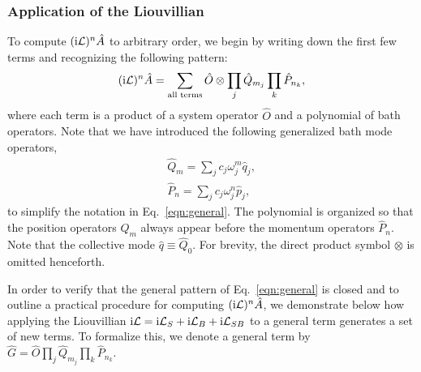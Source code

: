 \documentclass[preprint,aip,jcp]{revtex4-2}
\newcommand{\im}{\textup{i}}
\newcommand{\Lv}{\mathcal{L}}
\begin{document}
\subsubsection{Application of the Liouvillian \label{subsec:liouvillian}}
To compute $(\im\Lv)^n \hat{A}$ to arbitrary order,  we begin by writing down the first few terms and recognizing the following pattern: 
\begin{equation}\label{eqn:general}
    (\im \Lv)^n \hat{A} = \sum_{\text{all terms}} \hat{O} \otimes \prod_{j} \hat{Q}_{m_{j}} \prod_{k} \hat{P}_{n_k},
\end{equation}
where each term is a product of a system operator $\hat{O}$ and a polynomial of bath operators. Note that we have introduced the following generalized bath mode operators,
\begin{gather}
    \hat{Q}_m = \sum_j c_j \omega_j^{m} \hat{q}_j, \\
    \hat{P}_n = \sum_j c_j \omega_j^{n} \hat{p}_j, 
\end{gather}
to simplify the notation in Eq.~\ref{eqn:general}. The polynomial is organized so that the position operators $\hat{Q}_m$ always appear before the momentum operators $\hat{P}_n$. Note that the collective mode $\hat{q} \equiv \hat{Q}_0$. For brevity, the direct product symbol $\otimes$ is omitted henceforth.

In order to verify that the general pattern of Eq.~\ref{eqn:general} is closed and to outline a practical procedure for computing $(\im\Lv)^n \hat{A}$, we demonstrate below how applying the Liouvillian $\im\Lv = \im\Lv_S + \im\Lv_B +  \im\Lv_{SB}$ to a general term generates a set of new terms. To formalize this, we denote a general term by $\hat{G} = \hat{O} \prod_{j} \hat{Q}_{m_j} \prod_{k} \hat{P}_{n_k}$.
\end{document}
